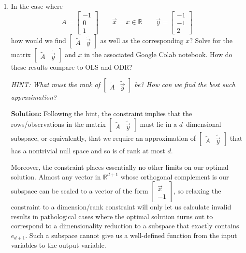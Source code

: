 \documentclass[10pt]{article}
\newcommand{\RR}{\mathbb{R}}
\begin{document}
\begin{enumerate}[label=(\alph*), start=8]
\item In the case where
\[
A = \begin{bmatrix} -1 \\ 0 \\ 1 \end{bmatrix} \qquad \vec{x} = x \in \RR \qquad \vec{y} = \begin{bmatrix} -1 \\ -1 \\ 2 \end{bmatrix}
\]
how would we find $\begin{bmatrix} \tilde{A} & \tilde{\vec{y}} \end{bmatrix}$ as well as the corresponding $x$? Solve for the matrix $\begin{bmatrix} \tilde{A} & \tilde{\vec{y}} \end{bmatrix}$ and $x$ in the associated Google Colab notebook. How do these results compare to OLS and ODR?

\textit{HINT: What must the rank of $\begin{bmatrix} \tilde{A} & \tilde{\vec{y}} \end{bmatrix}$ be? How can we find the best such approximation?}

\textbf{Solution:} Following the hint, the constraint implies that the rows/observations in the matrix $\begin{bmatrix} \tilde{A} & \tilde{\vec{y}} \end{bmatrix}$ must lie in a $d$--dimensional subspace, or equivalently, that we require an approximation of $\begin{bmatrix} \tilde{A} & \tilde{\vec{y}} \end{bmatrix}$ that has a nontrivial null space and so is of rank at most $d$.

Moreover, the constraint places essentially no other limits on our optimal solution. Almost any vector in $\RR^{d+1}$ whose orthogonal complement is our subspace can be scaled to a vector of the form $\begin{bmatrix} \vec{x} \\ -1 \end{bmatrix}$, so relaxing the constraint to a dimension/rank constraint will only let us calculate invalid results in pathological cases where the optimal solution turns out to correspond to a dimensionality reduction to a subspace that exactly contains $e_{d+1}$. Such a subspace cannot give us a well-defined function from the input variables to the output variable.


\end{enumerate}
\end{document}
